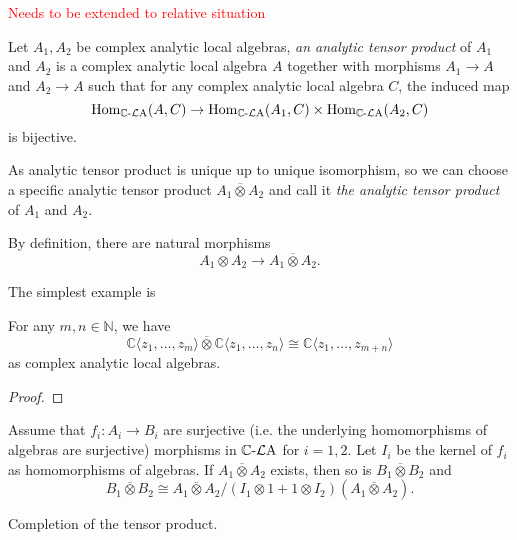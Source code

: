 \textcolor{red}{Needs to be extended to relative situation}
\begin{definition}
    Let $A_1,A_2$ be complex analytic local algebras, \emph{an analytic tensor product} of $A_1$ and $A_2$ is a complex analytic local algebra $A$ together with morphisms $A_1\rightarrow A$ and $A_2\rightarrow A$ such that for any complex analytic local algebra $C$, the induced map
    \[
      \operatorname{Hom}_{\mathbb{C}\text{-}\mathcal{L}\mathrm{A}}(A,C)\rightarrow  \operatorname{Hom}_{\mathbb{C}\text{-}\mathcal{L}\mathrm{A}}(A_1,C)\times  \operatorname{Hom}_{\mathbb{C}\text{-}\mathcal{L}\mathrm{A}}(A_2,C)
    \]
    is bijective.

    As analytic tensor product is unique up to unique isomorphism, so we can choose a specific analytic tensor product $A_1\overline{\otimes} A_2$ and call it \emph{the analytic tensor product} of $A_1$ and $A_2$.
\end{definition}
By definition, there are natural morphisms 
\[
    A_1\otimes A_2\rightarrow A_1\overline{\otimes} A_2.
\]

The simplest example is 
\begin{lemma}
    For any $m,n\in \mathbb{N}$, we have
    \[
        \mathbb{C}\langle z_1,\ldots,z_m \rangle\overline{\otimes} \mathbb{C}\langle z_1,\ldots,z_n \rangle\cong  \mathbb{C}\langle z_1,\ldots,z_{m+n} \rangle
    \]
    as complex analytic local algebras.
\end{lemma}
\begin{proof}
    
\end{proof}

\begin{lemma}
    Assume that $f_i:A_i\rightarrow B_i$ are  surjective (i.e. the underlying homomorphisms of algebras are surjective) morphisms in $\mathbb{C}\text{-}\mathcal{L}\mathrm{A}$ for $i=1,2$. Let $I_i$ be the kernel of $f_i$ as homomorphisms of algebras.
    If $A_1\overline{\otimes} A_2$ exists, then so is $B_1 \overline{\otimes} B_2$ and
    \[
        B_1 \overline{\otimes} B_2\cong A_1\overline{\otimes} A_2/ (I_1\otimes 1+1\otimes I_2)(A_1\overline{\otimes} A_2).
    \]
\end{lemma}


\begin{theorem}
    Completion of the tensor product.
\end{theorem}

\cite{stacks-project}

\printbibliography
